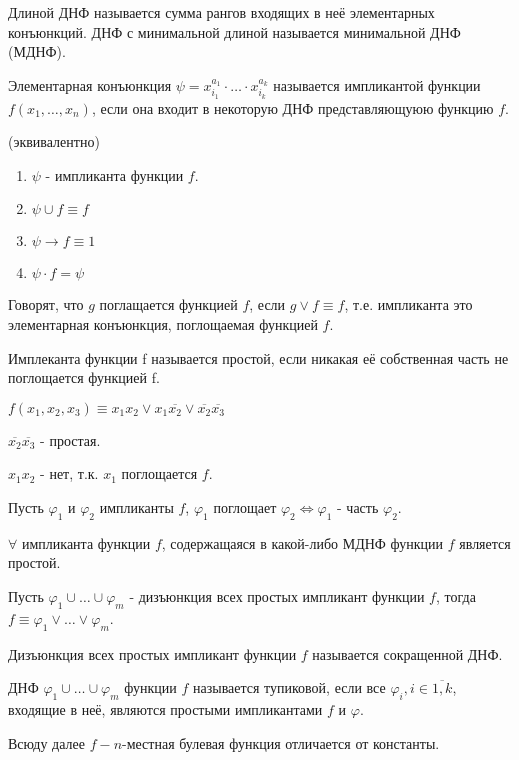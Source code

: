 \opr Длиной ДНФ называется сумма рангов входящих в неё элементарных конъюнкций. ДНФ с минимальной длиной называется минимальной ДНФ (МДНФ).

\opr Элементарная конъюнкция $\psi = x_{i_1}^{a_1}\cdot \dotsc \cdot x_{i_k}^{a_k}$ называется импликантой функции $f(x_1,\dotsc,x_n)$, если она входит в некоторую ДНФ представляющуюю функцию $f$.

\utv (эквивалентно)
\begin{enumerate}
	\item $\psi$ - импликанта функции $f$.
	\item $\psi \cup f \equiv f$
	\item $\psi \rightarrow f \equiv 1$
	\item $\psi \cdot f = \psi$
\end{enumerate}

\opr Говорят, что $g$ поглащается функцией $f$, если $g \vee f \equiv f$, т.е. импликанта это элементарная конъюнкция, поглощаемая функцией $f$.

\opr Имплеканта функции f называется простой, если никакая её собственная часть не поглощается функцией f.

\examplei

$f(x_1, x_2, x_3) \equiv x_1x_2 \vee x_1\overline{x_2}\vee \overline{x_2} \overline{x_3}$

$\overline{x_2} \overline{x_3}$ - простая.

$x_1x_2$ - нет, т.к. $x_1$ поглощается $f$.

\lem Пусть $\varphi_1$ и $\varphi_2$ импликанты $f$, $\varphi_1$ поглощает $\varphi_2 \Leftrightarrow \varphi_1$ - часть $\varphi_2$.

\thr $\forall$ импликанта функции $f$, содержащаяся в какой-либо МДНФ функции $f$ является простой.

\thr Пусть $\varphi_1 \cup\dotsc\cup \varphi_m$ - дизъюнкция всех простых импликант функции $f$, тогда \\ $f \equiv \varphi_1 \vee\dotsc\vee \varphi_m$.

\opr Дизъюнкция всех простых импликант функции $f$ называется сокращенной ДНФ.

\opr ДНФ $\varphi_1 \cup\dotsc\cup \varphi_m$ функции $f$ называется тупиковой, если все $\varphi_i, i \in \overline{1, k}$, входящие в неё, являются простыми импликантами $f$ и $\varphi$.

Всюду далее $f-n$-местная булевая функция отличается от константы.

